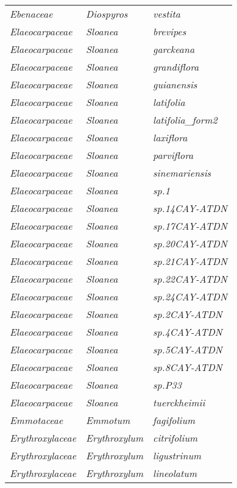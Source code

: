 \documentclass[fleqn,10pt]{ArtEcoFoG} %
\renewenvironment{table}{\begin{table*}}{\end{table*}\ignorespacesafterend}
\begin{document}
\begin{table}
\begin{tabular}[t]{lll}
\em{Ebenaceae} & \em{Diospyros} & \em{vestita}\\
\em{Elaeocarpaceae} & \em{Sloanea} & \em{brevipes}\\
\em{Elaeocarpaceae} & \em{Sloanea} & \em{garckeana}\\
\addlinespace
\em{Elaeocarpaceae} & \em{Sloanea} & \em{grandiflora}\\
\em{Elaeocarpaceae} & \em{Sloanea} & \em{guianensis}\\
\em{Elaeocarpaceae} & \em{Sloanea} & \em{latifolia}\\
\em{Elaeocarpaceae} & \em{Sloanea} & \em{latifolia\_form2}\\
\em{Elaeocarpaceae} & \em{Sloanea} & \em{laxiflora}\\
\addlinespace
\em{Elaeocarpaceae} & \em{Sloanea} & \em{parviflora}\\
\em{Elaeocarpaceae} & \em{Sloanea} & \em{sinemariensis}\\
\em{Elaeocarpaceae} & \em{Sloanea} & \em{sp.1}\\
\em{Elaeocarpaceae} & \em{Sloanea} & \em{sp.14CAY-ATDN}\\
\em{Elaeocarpaceae} & \em{Sloanea} & \em{sp.17CAY-ATDN}\\
\addlinespace
\em{Elaeocarpaceae} & \em{Sloanea} & \em{sp.20CAY-ATDN}\\
\em{Elaeocarpaceae} & \em{Sloanea} & \em{sp.21CAY-ATDN}\\
\em{Elaeocarpaceae} & \em{Sloanea} & \em{sp.22CAY-ATDN}\\
\em{Elaeocarpaceae} & \em{Sloanea} & \em{sp.24CAY-ATDN}\\
\em{Elaeocarpaceae} & \em{Sloanea} & \em{sp.2CAY-ATDN}\\
\addlinespace
\em{Elaeocarpaceae} & \em{Sloanea} & \em{sp.4CAY-ATDN}\\
\em{Elaeocarpaceae} & \em{Sloanea} & \em{sp.5CAY-ATDN}\\
\em{Elaeocarpaceae} & \em{Sloanea} & \em{sp.8CAY-ATDN}\\
\em{Elaeocarpaceae} & \em{Sloanea} & \em{sp.P33}\\
\em{Elaeocarpaceae} & \em{Sloanea} & \em{tuerckheimii}\\
\addlinespace
\em{Emmotaceae} & \em{Emmotum} & \em{fagifolium}\\
\em{Erythroxylaceae} & \em{Erythroxylum} & \em{citrifolium}\\
\em{Erythroxylaceae} & \em{Erythroxylum} & \em{ligustrinum}\\
\em{Erythroxylaceae} & \em{Erythroxylum} & \em{lineolatum}\\

\end{tabular}
\end{table}
\end{document}
